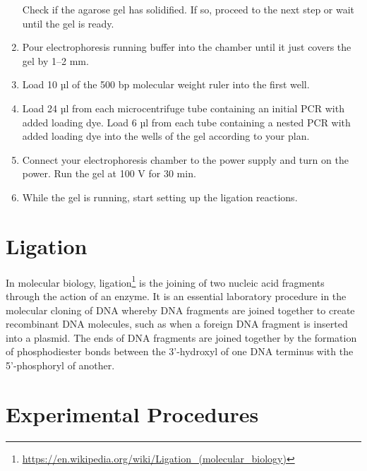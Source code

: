 \documentclass[]{book}
\let\rmarkdownfootnote\footnote%
\def\footnote{\protect\rmarkdownfootnote}
\renewcommand{\href}[2]{#2\footnote{\url{#1}}}
\begin{document}
\begin{enumerate}
  Check if the agarose gel has solidified. If so, proceed to the next step or wait until the gel is ready.
\item
  Pour electrophoresis running buffer into the chamber until it just covers the gel by 1--2 mm.
\item
  Load 10 µl of the 500 bp molecular weight ruler into the first well.
\item
  Load 24 µl from each microcentrifuge tube containing an initial PCR with added loading dye. Load 6 µl from each tube containing a nested PCR with added loading dye into the wells of the gel according to your plan.
\item
  Connect your electrophoresis chamber to the power supply and turn on the power. Run the gel at 100 V for 30 min.
\item
  While the gel is running, start setting up the ligation reactions.
\end{enumerate}

\hypertarget{ligation}{%
\section{Ligation}\label{ligation}}

In molecular biology, \href{https://en.wikipedia.org/wiki/Ligation_(molecular_biology)}{ligation} is the joining of two nucleic acid fragments through the action of an enzyme. It is an essential laboratory procedure in the molecular cloning of DNA whereby DNA fragments are joined together to create recombinant DNA molecules, such as when a foreign DNA fragment is inserted into a plasmid. The ends of DNA fragments are joined together by the formation of phosphodiester bonds between the 3'-hydroxyl of one DNA terminus with the 5'-phosphoryl of another.

\hypertarget{experimental-procedures-14}{%
\section{Experimental Procedures}\label{experimental-procedures-14}}
\end{document}
